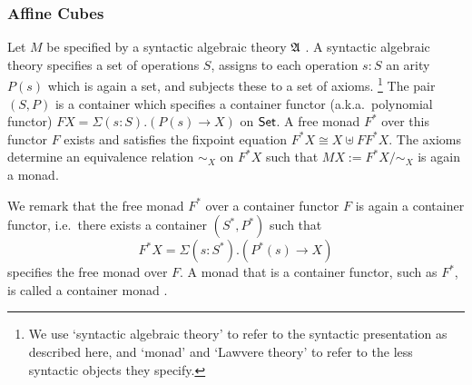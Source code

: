 \documentclass[a4paper]{article}
\begin{document}
\subsubsection{Affine Cubes}
Let $M$ be specified by a syntactic algebraic theory ${\mathfrak A}$ \cite{manes-book,adamek-book,keml-diagrams}.
A syntactic algebraic theory specifies a set of operations $S$, assigns to each operation $s : S$ an arity $P(s)$ which is again a set, and subjects these to a set of axioms.%
\footnote{We use `syntactic algebraic theory' to refer to the syntactic presentation as described here, and `monad' and `Lawvere theory' to refer to the less syntactic objects they specify.
%
}
The pair $(S, P)$ is a container \cite{containers} which specifies a container functor (a.k.a.\ polynomial functor) $FX = \Sigma(s : S).(P(s) \to X)$ on ${\mathsf{Set}}$.
A free monad $F^*$ over this functor $F$ exists and satisfies the fixpoint equation $F^* X \cong X \uplus F F^* X$.
The axioms determine an equivalence relation $\sim_X$ on $F^* X$ such that $M X := F^* X/\sim_X$ is again a monad.

We remark that the free monad $F^*$ over a container functor $F$ is again a container functor, i.e.\ there exists a container $(S^*, P^*)$ such that
\[
	F^* X = \Sigma(s : S^*).(P^*(s) \to X)
\]
specifies the free monad over $F$.
A monad that is a container functor, such as $F^*$, is called a container monad \cite{container-combinatorics}.
\end{document}
